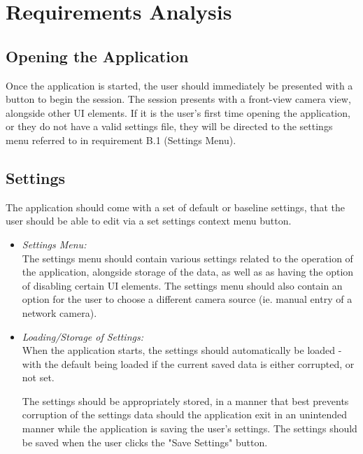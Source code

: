 \documentclass[conference]{IEEEtran}
\begin{document}
\section{Requirements Analysis}

\subsection{Opening the Application}
Once the application is started, the user should immediately be presented with a button to begin the session. The session presents with a front-view camera view, alongside other UI elements. If it is the user's first time opening the application, or they do not have a valid settings file, they will be directed to the settings menu referred to in requirement B.1 (Settings Menu).
\newline
\subsection {Settings}

The application should come with a set of default or baseline settings, that the user should be able to edit via a set settings context menu button.
\newline
\begin{itemize}
\item{\emph{Settings Menu:}}\\
The settings menu should contain various settings related to the operation of the application, alongside storage of the data, as well as as having the option of disabling certain UI elements. The settings menu should also contain an option for the user to choose a different camera source (ie. manual entry of a network camera).
\newline

\item{\emph{Loading/Storage of Settings:}}\\
When the application starts, the settings should automatically be loaded - with the default being loaded if the current saved data is either corrupted, or not set. 

The settings should be appropriately stored, in a manner that best prevents corruption of the settings data should the application exit in an unintended manner while the application is saving the user's settings. The settings should be saved when the user clicks the "Save Settings" button.
\newline
\end{itemize}
\end{document}
